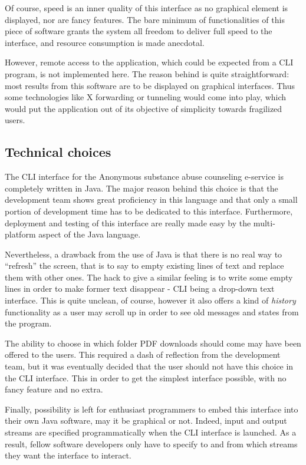 \documentclass[a4paper,12pt, twocolumn]{article}
\begin{document}
Of course, speed is an inner quality of this interface as no graphical element is displayed, nor are fancy features. The bare minimum of functionalities of this piece of software grants the system all freedom to deliver full speed to the interface, and resource consumption is made anecdotal.

However, remote access to the application, which could be expected from a CLI program, is not implemented here. The reason behind is quite straightforward: most results from this software are to be displayed on graphical interfaces. Thus some technologies like X forwarding or tunneling would come into play, which would put the application out of its objective of simplicity towards fragilized users.

\subsection*{Technical choices}

The CLI interface for the Anonymous substance abuse counseling e-service is completely written in Java. The major reason behind this choice is that the development team shows great proficiency in this language and that only a small portion of development time has to be dedicated to this interface. Furthermore, deployment and testing of this interface are really made easy by the multi-platform aspect of the Java language.

Nevertheless, a drawback from the use of Java is that there is no real way to ``refresh'' the screen, that is to say to empty existing lines of text and replace them with other ones. The hack to give a similar feeling is to write some empty lines in order to make former text disappear - CLI being a drop-down text interface. This is quite unclean, of course, however it also offers a kind of \emph{history} functionality as a user may scroll up in order to see old messages and states from the program.

The ability to choose in which folder PDF downloads should come may have been offered to the users. This required a dash of reflection from the development team, but it was eventually decided that the user should not have this choice in the CLI interface. This in order to get the simplest interface possible, with no fancy feature and no extra.

Finally, possibility is left for enthusiast programmers to embed this interface into their own Java software, may it be graphical or not. Indeed, input and output streams are specified programmatically when the CLI interface is launched. As a result, fellow software developers only have to specify to and from which streams they want the interface to interact.
\end{document}
